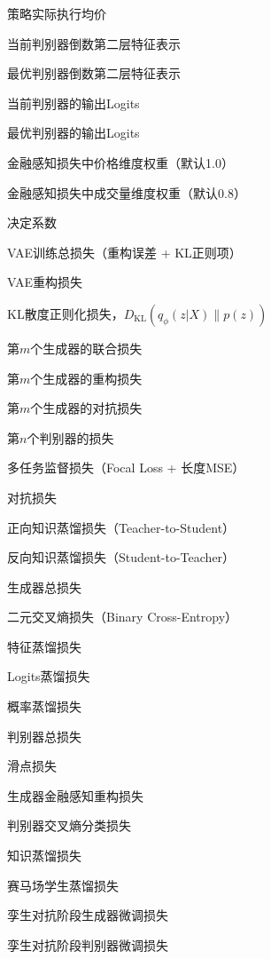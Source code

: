 \item[$\bar{P}_{\mathrm{exec}}$] 策略实际执行均价
\item[$\mathbf{f}_i$] 当前判别器倒数第二层特征表示
\item[$\mathbf{f}^*$] 最优判别器倒数第二层特征表示
\item[$\mathbf{z}_i$] 当前判别器的输出Logits
\item[$\mathbf{z}^*$] 最优判别器的输出Logits
\item[$w_p$] 金融感知损失中价格维度权重（默认1.0）
\item[$w_v$] 金融感知损失中成交量维度权重（默认0.8）
\item[$R^2$] 决定系数

\item[$\mathcal{L}_{\text{VAE}}$] VAE训练总损失（重构误差 + KL正则项）
\item[$\mathcal{L}_{\text{rec}}^{\text{VAE}}$] VAE重构损失
\item[$\mathcal{L}_{\text{KL}}$] KL散度正则化损失，$D_{\mathrm{KL}}(q_\phi(z|X) \| p(z))$
\item[$\mathcal{L}_{G_m}$] 第$m$个生成器的联合损失
\item[$\mathcal{L}_{\text{rec}}^{(m)}$] 第$m$个生成器的重构损失
\item[$\mathcal{L}_{\text{adv}}^{(m)}$] 第$m$个生成器的对抗损失
\item[$\mathcal{L}_{D_n}$] 第$n$个判别器的损失
\item[$L_{\text{supervised}}$] 多任务监督损失（Focal Loss + 长度MSE）
\item[$L_{\text{adv}}$] 对抗损失
\item[$L_{\text{T2S}}$] 正向知识蒸馏损失（Teacher-to-Student）
\item[$L_{\text{RT-Wave}}$] 反向知识蒸馏损失（Student-to-Teacher）
\item[$L_G$] 生成器总损失
\item[$L_{\text{bce}}$] 二元交叉熵损失（Binary Cross-Entropy）
\item[$L_{\text{feat}}$] 特征蒸馏损失
\item[$L_{\text{logit}}$] Logits蒸馏损失
\item[$L_{\text{prob}}$] 概率蒸馏损失
\item[$L_D$] 判别器总损失
\item[$\mathcal{L}_{\text{slippage}}$] 滑点损失
\item[$\mathcal{L}_{G}^{\text{recon}}$] 生成器金融感知重构损失
\item[$\mathcal{L}_{D}^{\text{CE}}$] 判别器交叉熵分类损失
\item[$\mathcal{L}_{\text{Distill}}$] 知识蒸馏损失
\item[$\mathcal{L}_{\text{Student}}$] 赛马场学生蒸馏损失
\item[$\mathcal{L}_{G}^{\text{finetune}}$] 孪生对抗阶段生成器微调损失
\item[$\mathcal{L}_{D}^{\text{finetune}}$] 孪生对抗阶段判别器微调损失

